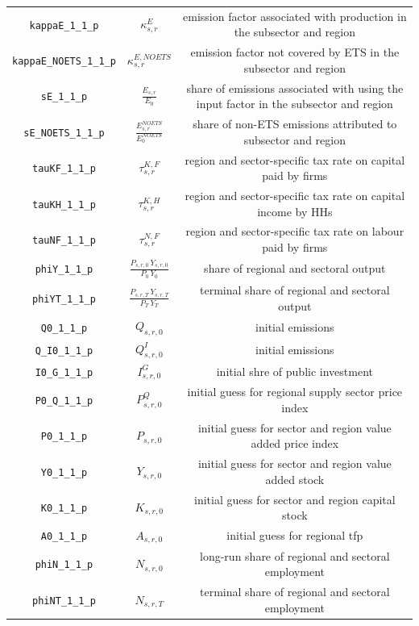 \begin{center}
\begin{longtable}{ccc}
\texttt{kappaE\_1\_1\_p} & ${\kappa^{E}_{s,r}}$ & emission factor associated with production in the subsector and region\\
\texttt{kappaE\_NOETS\_1\_1\_p} & ${\kappa^{E,NOETS}_{s,r}}$ & emission factor not covered by ETS in the subsector and region\\
\texttt{sE\_1\_1\_p} & ${\frac{E_{s,r}}{E_0}}$ & share of emissions associated with using the input factor in the subsector and region\\
\texttt{sE\_NOETS\_1\_1\_p} & ${\frac{E^{NOETS}_{s,r}}{E^{NOETS}_0}}$ & share of non-ETS emissions attributed to subsector and region\\
\texttt{tauKF\_1\_1\_p} & ${\tau^{K,F}_{s,r}}$ & region and sector-specific tax rate on capital paid by firms\\
\texttt{tauKH\_1\_1\_p} & ${\tau^{K,H}_{s,r}}$ & region and sector-specific tax rate on capital income by HHs\\
\texttt{tauNF\_1\_1\_p} & ${\tau^{N,F}_{s,r}}$ & region and sector-specific tax rate on labour paid by firms\\
\texttt{phiY\_1\_1\_p} & $\frac{P_{s,r,0} \, Y_{s,r,0}}{P_{0} \, Y_{0}}$ & share of regional and sectoral output\\
\texttt{phiYT\_1\_1\_p} & $\frac{P_{s,r,T} \, Y_{s,r,T}}{P_{T} \, Y_{T}}$ & terminal share of regional and sectoral output\\
\texttt{Q0\_1\_1\_p} & ${Q_{s,r,0}}$ & initial emissions\\
\texttt{Q\_I0\_1\_1\_p} & ${Q^I_{s,r,0}}$ & initial emissions\\
\texttt{I0\_G\_1\_1\_p} & ${I^G_{s,r,0}}$ & initial shre of public investment\\
\texttt{P0\_Q\_1\_1\_p} & ${P^Q_{s,r,0}}$ & initial guess for regional supply sector price index\\
\texttt{P0\_1\_1\_p} & ${P_{s,r,0}}$ & initial guess for sector and region value added price index\\
\texttt{Y0\_1\_1\_p} & ${Y_{s,r,0}}$ & initial guess for sector and region value added stock\\
\texttt{K0\_1\_1\_p} & ${K_{s,r,0}}$ & initial guess for sector and region capital stock\\
\texttt{A0\_1\_1\_p} & ${A_{s,r,0}}$ & initial guess for regional tfp\\
\texttt{phiN\_1\_1\_p} & ${N_{s,r,0}}$ & long-run share of regional and sectoral employment\\
\texttt{phiNT\_1\_1\_p} & ${N_{s,r,T}}$ & terminal share of regional and sectoral employment\\

\end{longtable}
\end{center}
